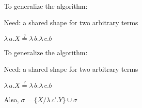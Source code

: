 \documentclass[pdf]{beamer}
\newcommand{\bd}[2] {
 #1/ #2
}
\begin{document}
\begin{frame}{To generalize the algorithm:}

  {\centering
    Need: a shared shape for two arbitrary terms
  \par}
  
  \vspace{1cm}
  {\centering
    $\lambda\,a.X \stackrel{?}{=} \lambda\,b.\lambda\,c.b$
  \par}
\begin{figure}[H]
  \centering
  \begin{minipage}{0.45\textwidth}
    \centering
{}
  \end{minipage}\hfill
    \begin{minipage}{0.45\textwidth}
    \centering
    \end{minipage}
  \end{figure}
\end{frame}

\begin{frame}{To generalize the algorithm:}

  {\centering
    Need: a shared shape for two arbitrary terms
  \par}
  \vspace{1cm}
  {\centering
    $\lambda\,a.X \stackrel{?}{=} \lambda\,b.\lambda\,c.b$
  \par}
\begin{figure}[H]
  \centering
  \begin{minipage}{0.45\textwidth}
    \centering
{}
  \end{minipage}\hfill
    \begin{minipage}{0.45\textwidth}
    \centering
    \end{minipage}
  \end{figure}
  
  {\centering
  Also, $\sigma = \{\bd{X}{\lambda\,c'.Y}\}\cup\sigma$
  \par}
\end{frame}
\end{document}
